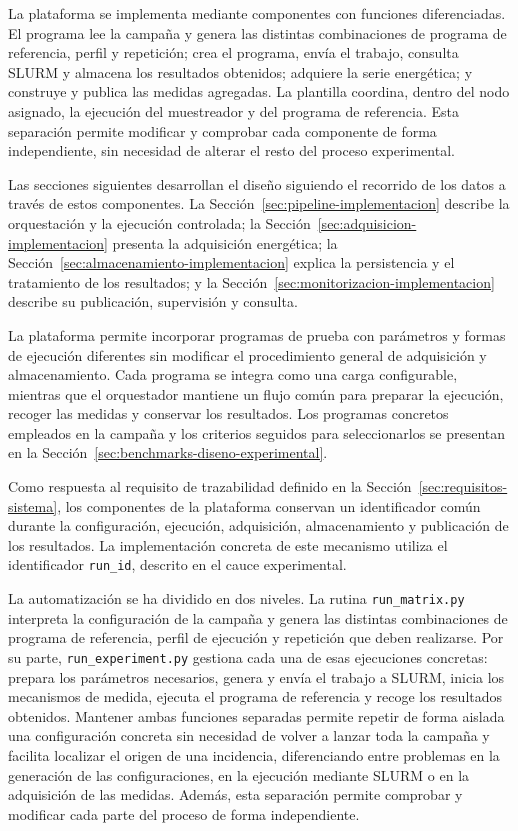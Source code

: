 La plataforma se implementa mediante componentes con funciones diferenciadas. El programa  lee la campaña y genera las distintas combinaciones de programa de referencia, perfil y repetición;  crea el programa, envía el trabajo, consulta SLURM y almacena los resultados obtenidos;  adquiere la serie energética; y  construye y publica las medidas agregadas. La plantilla  coordina, dentro del nodo asignado, la ejecución del muestreador y del programa de referencia. Esta separación permite modificar y comprobar cada componente de forma independiente, sin necesidad de alterar el resto del proceso experimental.

Las secciones siguientes desarrollan el diseño siguiendo el recorrido de los datos a través de estos componentes. La Sección~\ref{sec:pipeline-implementacion} describe la orquestación y la ejecución controlada; la Sección~\ref{sec:adquisicion-implementacion} presenta la adquisición energética; la Sección~\ref{sec:almacenamiento-implementacion} explica la persistencia y el tratamiento de los resultados; y la Sección~\ref{sec:monitorizacion-implementacion} describe su publicación, supervisión y consulta.

La plataforma permite incorporar programas de prueba con parámetros y formas de ejecución diferentes sin modificar el procedimiento general de adquisición y almacenamiento. Cada programa se integra como una carga configurable, mientras que el orquestador mantiene un flujo común para preparar la ejecución, recoger las medidas y conservar los resultados. Los programas concretos empleados en la campaña y los criterios seguidos para seleccionarlos se presentan en la Sección~\ref{sec:benchmarks-diseno-experimental}.

Como respuesta al requisito de trazabilidad definido en la Sección~\ref{sec:requisitos-sistema}, los componentes de la plataforma conservan un identificador común durante la configuración, ejecución, adquisición, almacenamiento y publicación de los resultados. La implementación concreta de este mecanismo utiliza el identificador \texttt{run\_id}, descrito en el cauce experimental.

La automatización se ha dividido en dos niveles. La rutina \texttt{run\_matrix.py} interpreta la configuración de la campaña y genera las distintas combinaciones de programa de referencia, perfil de ejecución y repetición que deben realizarse. Por su parte, \texttt{run\_experiment.py} gestiona cada una de esas ejecuciones concretas: prepara los parámetros necesarios, genera y envía el trabajo a SLURM, inicia los mecanismos de medida, ejecuta el programa de referencia y recoge los resultados obtenidos. Mantener ambas funciones separadas permite repetir de forma aislada una configuración concreta sin necesidad de volver a lanzar toda la campaña y facilita localizar el origen de una incidencia, diferenciando entre problemas en la generación de las configuraciones, en la ejecución mediante SLURM o en la adquisición de las medidas. Además, esta separación permite comprobar y modificar cada parte del proceso de forma independiente.

